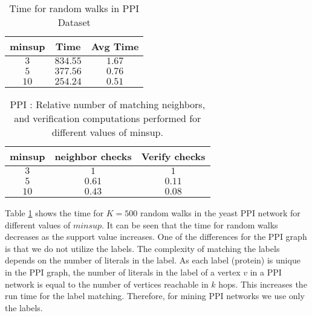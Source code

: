 \begin{table}[!h]
\centering
\begin{tabular}{|c|c|c|}
        \hline
        minsup & Time & Avg Time \\
		\hline
        $3$ & $834.55$ & $1.67$ \\
        $5$ & $377.56$ & $0.76$ \\
        $10$ & $254.24$ & $0.51$ \\
		\hline
    \end{tabular}
    \caption{Time for random walks in PPI Dataset }
\label{tab:ppi}
\end{table}

\begin{table}[!h]
\centering
\begin{tabular}{|c|c|c|}
	\hline
	minsup & neighbor checks & Verify checks \\
	\hline
	$3$ & $1$ & $1$ \\ 
	$5$ & $0.61$ & $0.11$ \\
	$10$ & $0.43$ & $0.08$ \\
	\hline
	\end{tabular}
	\caption{PPI : Relative number of matching neighbors, and verification computations performed
	for different values of minsup.}
	\label{tab:ppi_relative}
	\end{table}

\smallskip{} Table \ref{tab:ppi} shows the
time for $K=500$ random walks in the yeast PPI network for different
values of $minsup$.  It can be seen that the time for random walks
decreases as the support value increases.  One of the differences for
the PPI graph is that we do not utilize the \khop labels.  The
complexity of matching the \khop labels depends on the number of
literals in the \khop label.  As each label (protein) is unique in the
PPI graph, the number of literals in the \khop label of a vertex $v$ in
a PPI network is equal to the number of vertices reachable in $k$ hops.
This increases the run time for the \khop label matching.  Therefore,
for mining PPI networks we use only the \ncl labels.


